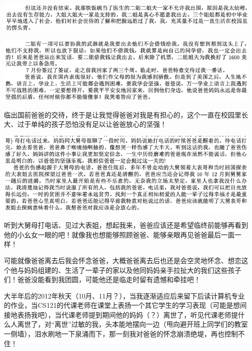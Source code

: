 \documentclass[9pt, b5paper]{article}
\begin{document}
\begin{center}
\includegraphics[width=.9\linewidth]{./pic/backups_plans_20210415_100910.png}
\end{center}

\begin{center}
\includegraphics[width=.9\linewidth]{./pic/backups_plans_20210415_100926.png}
\end{center}

临出国前爸爸的交待，终于是让我觉得爸爸对我是有担心的，这个一直在校园里长大、过于单纯的孩子恐怕没有足以让爸爸放心的坚强！

\begin{center}
\includegraphics[width=.9\linewidth]{./pic/backups_plans_20210415_131810.png}
\end{center}

听到大舅母打电话、见过大表姐，想起我来，爸爸应该还是希望临终前能够再看到他的小幺女一眼的吧！就像我也想能够照顾爸爸、能够亲眼再见爸爸最后一面一样！

可能就像爸爸离去后我会怀念爸爸，大概爸爸离去后也还是会空灵地怀念、想恋这个他与妈妈组建的、生活了一辈子的家以及他同妈妈亲手拉扯大的我们这些孩子们！爸爸没能看到我团圆，可能他还是临走时留有遗憾和牵挂吧！

大半年后的2012年秋天（10月、11月？），当我逐渐适应后来留下后读计算机专业的作业，当CS121的代课老师在课堂上表扬一个其它学生的学习表现（可能是想间接地表扬我吧），当代课老师提到期间他的妈妈（？）离世了，听见代课老师提什么人离世了，对“离世”过敏的我，头本能地摆向一边（甩向避开班上同学们的教室一侧墙），泪水刷地一下泉涌而下，那一刻我对爸爸的怀念崩溃绝堤，再也控制不住！
\end{document}
